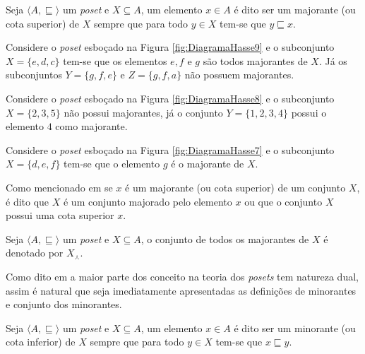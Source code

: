 \begin{definition}[Majorante]\label{def:Majorante}
	Seja $\langle A, \sqsubseteq \rangle$ um \textit{poset} e $X \subseteq A$, um elemento $x \in A$ é dito ser um majorante (ou cota superior) de $X$ sempre que para todo $y \in X$ tem-se que $y\sqsubseteq x$.
\end{definition}

\begin{example}
	Considere o \textit{poset} esboçado na Figura \ref{fig:DiagramaHasse9} e o subconjunto $X = \{e, d, c\}$ tem-se que os elementos $e, f$ e $g$ são todos majorantes de $X$. Já os subconjuntos $Y = \{g, f, e\}$ e $Z = \{g, f, a\}$ não possuem majorantes.
\end{example}

\begin{example}
	Considere o \textit{poset} esboçado na Figura \ref{fig:DiagramaHasse8} e o subconjunto $X = \{2, 3, 5\}$  não possui majorantes, já o conjunto $Y = \{1,2, 3, 4\}$ possui o elemento $4$ como majorante.
\end{example}

\begin{example}
	Considere o \textit{poset} esboçado na Figura \ref{fig:DiagramaHasse7} e o subconjunto $X = \{d, e, f\}$ tem-se que o elemento $g$ é o majorante de $X$.
\end{example}

Como mencionado em \cite{abe1991-TC} se $x$ é um majorante (ou cota superior) de um conjunto $X$, é dito que $X$ é um conjunto majorado pelo elemento $x$ ou que o conjunto $X$ possui uma cota superior $x$.

\begin{definition}\label{def:ConjuntoDosMajorantes}
	Seja $\langle A, \sqsubseteq \rangle$ um \textit{poset} e $X \subseteq A$, o conjunto de todos os majorantes de $X$ é denotado por $X_\curlywedge$.
\end{definition}

Como dito em \cite{abe1991-TC, carmo2013, morgado1962poset} a maior parte dos conceito na teoria dos \textit{posets} tem natureza dual, assim é natural que seja imediatamente apresentadas as definições de minorantes e conjunto dos minorantes.

\begin{definition}[Minorante]\label{def:Mjnorante}
	Seja $\langle A, \sqsubseteq \rangle$ um \textit{poset} e $X \subseteq A$, um elemento $x \in A$ é dito ser um minorante (ou cota inferior) de $X$ sempre que para todo $y \in X$ tem-se que $x\sqsubseteq y$.
\end{definition}

